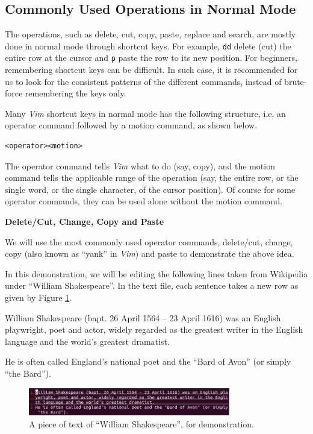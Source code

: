\subsection{Commonly Used Operations in Normal Mode}

The operations, such as delete, cut, copy, paste, replace and search, are mostly done in normal mode through shortcut keys. For example, \verb|dd| delete (cut) the entire row at the cursor and \verb|p| paste the row to its new position. For beginners, remembering shortcut keys can be difficult. In such case, it is recommended for us to look for the consistent patterns of the different commands, instead of brute-force remembering the keys only.

Many \textit{Vim} shortcut keys in normal mode has the following structure, i.e. an operator command followed by a motion command, as shown below.
\begin{verbatim}
<operator><motion>
\end{verbatim}
The operator command tells \textit{Vim} what to do (say, copy), and the motion command tells the applicable range of the operation (say, the entire row, or the single word, or the single character, of the cursor position). Of course for some operator commands, they can be used alone without the motion command.

\vspace{0.1in}
\noindent \textbf{Delete/Cut, Change, Copy and Paste}
\vspace{0.1in}

We will use the most commonly used operator commands, delete/cut, change, copy (also known as ``yank'' in \textit{Vim}) and paste to demonstrate the above idea.

In this demonstration, we will be editing the following lines taken from Wikipedia under ``William Shakespeare''. In the text file, each sentence takes a new row as given by Figure \ref{ch3fig:vimdemo1}.

\begin{shortbox}
William Shakespeare (bapt. 26 April 1564 – 23 April 1616) was an English playwright, poet and actor, widely regarded as the greatest writer in the English language and the world's greatest dramatist.

He is often called England's national poet and the ``Bard of Avon'' (or simply ``the Bard'').
\end{shortbox}

\begin{figure}
\centering
\includegraphics[width=250pt]{chapters/chapter3/figures/vimdemo1.png}
\caption{A piece of text of ``William Shakespeare'', for demonstration.} \label{ch3fig:vimdemo1}
\end{figure}

